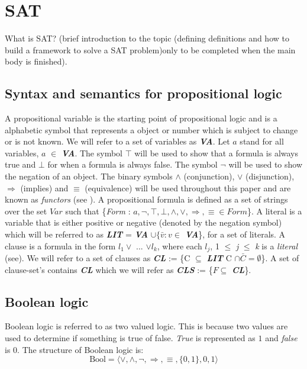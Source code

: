 \documentclass[11pt,a4paper]{report}
\begin{document}
\section{SAT}
\label{sec:SAT}

What is SAT? (brief introduction to the topic (defining definitions and how to build a framework to solve a SAT problem)only to be completed when the main body is finished).

\subsection{Syntax and semantics for propositional logic}
\label{sec:syntaxsem}

A propositional variable is the starting point of propositional logic and is a alphabetic symbol that represents a object or number which is subject to change or is not known. We will refer to a set of variables as \textit{\textbf{VA}}. Let $a$ stand for all variables, $a$ $\in$ \textit{\textbf{VA}}. The symbol $\top$ will be used to show that a formula is always true and $\bot$ for when a formula is always false. The symbol $\neg$ will be used to show the negation of an object. The binary symbols $\land$ (conjunction), $\lor$ (disjunction), $\Rightarrow$ (implies) and $\equiv$ (equivalence) will be used throughout this paper and are known as \textit{functors} (see \cite{Marek2009Introduction}). A propositional formula is defined as a set of strings over the set $Var$ such that \{\textit{Form} : $a, \neg, \top, \bot, \land, \lor, \Rightarrow, \equiv \in Form$\}. A literal is a variable that is either positive or negative (denoted by the negation symbol) which will be referred to as \textbf{\textit{LIT}} =  \textit{\textbf{VA}} $\cup \{ \bar{v} : v \in$ \textbf{\textit{VA}}\}, for a set of literals. A clause is a formula in the form $l_1 \lor$ ... $\lor l_k$, where each $l_j$, 1 $\le$ \textit{j} $\le$ \textit{k} is a \textit{literal} (see\cite{Marek2009Introduction}). We will refer to a set of clauses as \textbf{\textit{CL}} := \{C $\subseteq$ \textbf{\textit{LIT}} C $\cap \bar{C} = \emptyset$\}. A set of clause-set's contains \textbf{\textit{CL}} which we will refer as \textbf{\textit{CLS}} := \{$F \subseteq$ \textit{\textbf{CL}}\}.

\subsection{Boolean logic}
\label{sec:bool}

Boolean logic is referred to as two valued logic. This is because two values are used to determine if something is true of false. \emph{True} is represented as $1$ and \emph{false} is $0$. The structure of Boolean logic is:
\begin{displaymath}
\text{Bool} = \langle \lor, \land, \neg, \Rightarrow, \equiv,\{0,1\}, 0, 1 \rangle
\end{displaymath}
\end{document}

